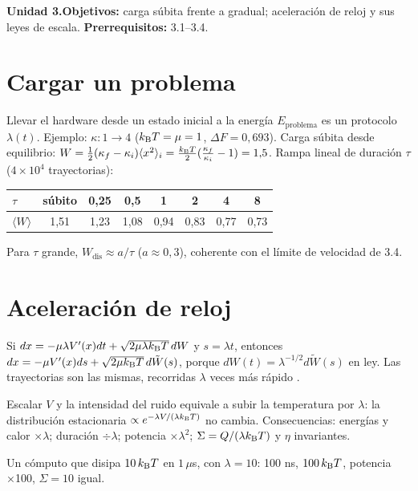 \documentclass[11pt,a4paper]{article}
\begin{document}

\noindent\textbf{Unidad 3.}\quad\textbf{Objetivos:} carga súbita frente a gradual; aceleración de reloj y sus leyes de escala.
\textbf{Prerrequisitos:} 3.1--3.4.

\section{Cargar un problema}
Llevar el hardware desde un estado inicial a la energía $E_{\text{problema}}$ es un protocolo $\lambda(t)$. Ejemplo: $\kappa:1\to4$
($k_{\mathrm B} T=\mu=1$, $\Delta F=0{,}693$). Carga súbita desde equilibrio: $W=\frac12(\kappa_f-\kappa_i)\langle x^2\rangle_i=\frac{k_{\mathrm B} T}2(\frac{\kappa_f}{\kappa_i}-1)=1{,}5$.
Rampa lineal de duración $\tau$ \evS{} ($4\times10^4$ trayectorias):
\begin{center}\begin{tabular}{lccccccc}\toprule
$\tau$ & súbito & 0,25 & 0,5 & 1 & 2 & 4 & 8\\\midrule
$\langle W\rangle$ & 1,51 & 1,23 & 1,08 & 0,94 & 0,83 & 0,77 & 0,73\\\bottomrule\end{tabular}\end{center}
Para $\tau$ grande, $W_{\text{dis}}\approx a/\tau$ ($a\approx0{,}3$), coherente con el límite de velocidad de 3.4.

\section{Aceleración de reloj}
\begin{resultado}
Si $dx=-\mu\lambda V'(x)dt+\sqrt{2\mu\lambda k_{\mathrm B} T}\,dW$ y $s=\lambda t$, entonces $dx=-\mu V'(x)ds+\sqrt{2\mu k_{\mathrm B} T}\,d\tilde W(s)$, porque
$dW(t)=\lambda^{-1/2}d\tilde W(s)$ en ley. Las trayectorias son las mismas, recorridas $\lambda$ veces más rápido \cite{whitelam}.
\end{resultado}
Escalar $V$ y la intensidad del ruido equivale a subir la temperatura por $\lambda$: la distribución estacionaria $\propto e^{-\lambda V/(\lambda k_{\mathrm B} T)}$
no cambia. Consecuencias: energías y calor $\times\lambda$; duración $\div\lambda$; potencia $\times\lambda^2$; $\Sigma=Q/(\lambda k_{\mathrm B} T)$ y $\eta$ invariantes.
\begin{ejemplo}
Un cómputo que disipa $10\,k_{\mathrm B} T$ en $1\,\mu$s, con $\lambda=10$: 100 ns, $100\,k_{\mathrm B} T$, potencia ×100, $\Sigma=10$ igual.
\end{ejemplo}
\end{document}
